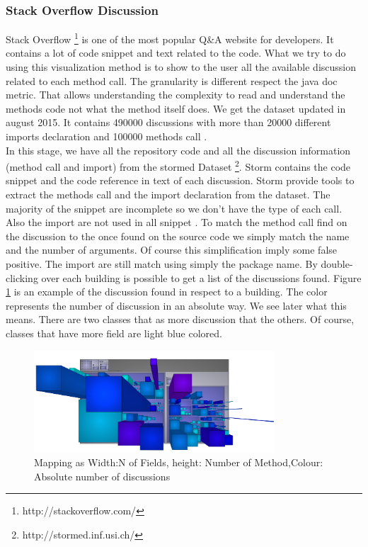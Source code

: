 \documentclass[]{usiinfbachelorproject}
\begin{document}
\subsubsection{Stack Overflow  Discussion}

Stack Overflow \footnote{http://stackoverflow.com/} is one of the most popular Q\&A website for developers. It contains a lot of code snippet and text related to the code. What we try to do using this visualization method is to show to the user all the available discussion related to each method call. The granularity is different respect the java doc metric. That allows understanding the complexity to read and understand the methods code not what the method itself does. We get the dataset updated in august 2015. It contains  490000 discussions with more than 20000 different imports declaration and 100000 methods call \cite{stormy}.\\
In this stage, we have all the repository code and all the discussion information (method call and import) from the stormed  Dataset \footnote{http://stormed.inf.usi.ch/}. 
Storm contains  the code snippet and the code reference in text of  each discussion. Storm provide tools to extract the methods call and the import declaration from the dataset. The  majority of the snippet are incomplete so we don't have the type of each call. Also the import are not used in all snippet \cite{stormy}. To match the method call find on the discussion to the once found on the source code we simply match the name and the number of arguments. Of course this simplification imply some false positive. The import are still match using simply the package name.
By double-clicking over each building is possible to get a list of the discussions found.
Figure \ref{fig:disc} is an example of the discussion found in respect to a building. The color represents the number of discussion in an absolute way. We see later what this means. There are two classes that as more discussion that the others. Of course, classes that have more field are light blue colored.


\begin{figure}[H]
	\centering
	\includegraphics[width=0.8\textwidth]{images/discAbsLang}
	
	\caption[Discussion Mapping]{Mapping as Width:N of Fields, height: Number of Method,Colour: Absolute number of discussions\label{fig:disc}}

\end{figure}
\end{document}
